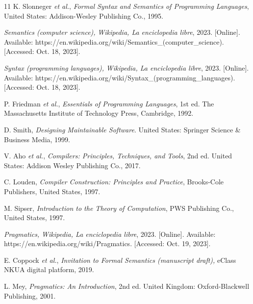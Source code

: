 \begin{thebibliography}{11}
    \label{sec:27}
    \hypertarget{27}{}
    K. Slonneger \textit{et al.}, \textit{Formal Syntax and Semantics of Programming Languages}, United States: Addison-Wesley Publishing Co., 1995.

    \label{sec:28}
    \hypertarget{28}{}
    \textit{Semantics (computer science), }\textit{Wikipedia, La enciclopedia libre}, 2023. [Online]. Available: https://en.wikipedia.org/wiki/Semantics\_(computer\_science). [Accessed: Oct. 18, 2023].

    \label{sec:29}
    \hypertarget{29}{}
    \textit{Syntax (programming languages), }\textit{Wikipedia, La enciclopedia libre}, 2023. [Online]. Available: https://en.wikipedia.org/wiki/Syntax\_(programming\_languages). [Accessed: Oct. 18, 2023].

    \label{sec:30}
    \hypertarget{30}{}
    P. Friedman \textit{et al.}, \textit{Essentials of Programming Languages}, 1st ed. The Massachusetts Institute of Technology Press, Cambridge, 1992.

    \label{sec:31}
    \hypertarget{31}{}
    D. Smith, \textit{Designing Maintainable Software}. United States: Springer Science \& Business Media, 1999.

    \label{sec:32}
    \hypertarget{32}{}
    V. Aho \textit{et al.}, \textit{Compilers: Principles, Techniques, and Tools}, 2nd ed. United States: Addison Wesley Publishing Co., 2017.

    \label{sec:33}
    \hypertarget{33}{}
    C. Louden, \textit{Compiler Construction: Principles and Practice}, Brooks-Cole Publishers, United States, 1997.

    \label{sec:34}
    \hypertarget{34}{}
    M. Sipser, \textit{Introduction to the Theory of Computation}, PWS Publishing Co., United States, 1997.

    \label{sec:35}
    \hypertarget{35}{}
    \textit{Pragmatics, }\textit{Wikipedia, La enciclopedia libre}, 2023. [Online]. Available: https://en.wikipedia.org/wiki/Pragmatics. [Accessed: Oct. 19, 2023].

    \label{sec:36}
    \hypertarget{36}{}
    E. Coppock \textit{et al.}, \textit{Invitation to Formal Semantics (manuscript draft), }eClass NKUA digital platform, 2019.

    \label{sec:37}
    \hypertarget{37}{}
    L. Mey, \textit{Pragmatics: An Introduction}, 2nd ed. United Kingdom: Oxford-Blackwell Publishing, 2001.


\end{thebibliography}
